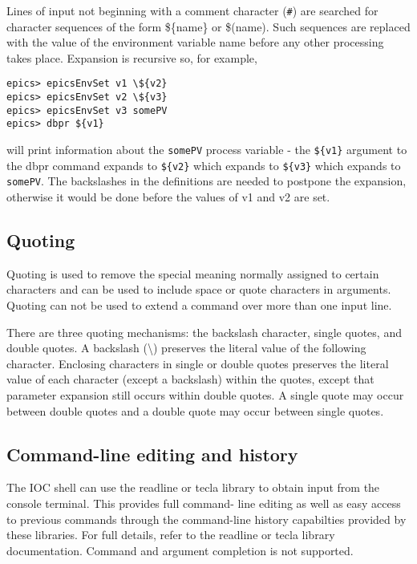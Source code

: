 Lines of input not beginning with a comment character (\verb|#|) are searched for character sequences of the form \$\{name\} or 
\$(name).  Such sequences are replaced with the value of the environment variable name before any other processing takes 
place.  Expansion is recursive so, for example,

\begin{verbatim}
epics> epicsEnvSet v1 \${v2}
epics> epicsEnvSet v2 \${v3}
epics> epicsEnvSet v3 somePV
epics> dbpr ${v1}
\end{verbatim}

will print information about the \verb|somePV| process variable - the \verb|${v1}| argument to the dbpr command expands to 
\verb|${v2}| which expands to \verb|${v3}| which expands to \verb|somePV|.  The backslashes in the definitions are needed to postpone 
the expansion, otherwise it would be done before the values of v1 and v2 are set.

\subsection{Quoting}

Quoting is used to remove the special meaning normally assigned to certain characters and can be used to include space or 
quote characters in arguments. Quoting can not be used to extend a command over more than one input line.

There are three quoting mechanisms: the backslash character, single quotes, and double quotes. A backslash (\textbackslash{}) preserves 
the literal value of the following character. Enclosing characters in single or double quotes preserves the literal value of 
each character (except a backslash) within the quotes, except that parameter expansion still occurs within double quotes.  
A single quote may occur between double quotes and a double quote may occur between single quotes.

\subsection{Command-line editing and history}

The IOC shell can use the readline or tecla library to obtain input from the console terminal. This provides full command-
line editing as well as easy access to previous commands through the command-line history capabilties provided by these 
libraries.  For full details, refer to the readline or tecla library documentation.  Command and argument completion is not 
supported.

